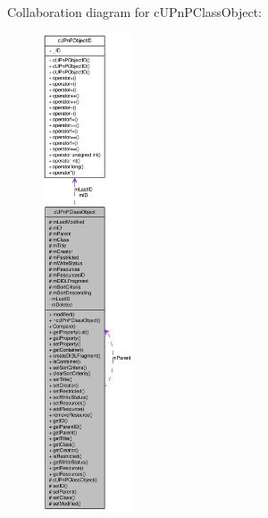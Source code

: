 Collaboration diagram for cUPnPClassObject:\nopagebreak
\begin{figure}[H]
\begin{center}
\leavevmode
\includegraphics[height=400pt]{classcUPnPClassObject__coll__graph}
\end{center}
\end{figure}
